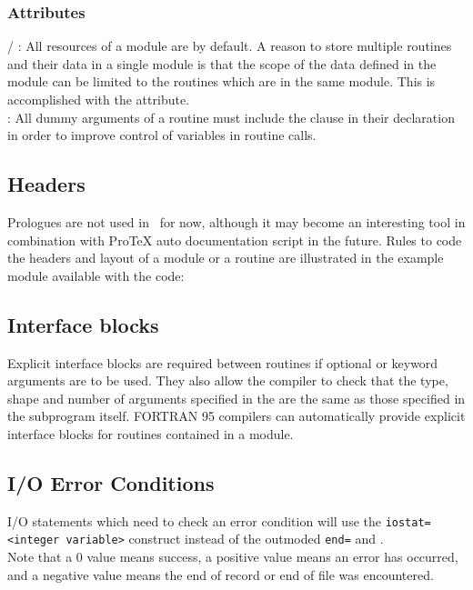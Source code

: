 \subsubsection{Attributes}

 / :
All resources of a module are  by default.
A reason to store multiple routines and their data in a single module is that
the scope of the data defined in the module can be limited to the routines which are in the same module.
This is accomplished with the  attribute. \\
:
All dummy arguments of a routine must include the  clause in their declaration in order to
improve control of variables in routine calls.

\subsection{Headers}

Prologues are not used in \NEMO\ for now, although it may become an interesting tool in combination with
ProTeX auto documentation script in the future.
Rules to code the headers and layout of a module or a routine are illustrated in the example module available with
the code: 

\subsection{Interface blocks}

Explicit interface blocks are required between routines if optional or keyword arguments are to be used.
They also allow the compiler to check that the type, shape and number of arguments specified in the 
are the same as those specified in the subprogram itself.
FORTRAN 95 compilers can automatically provide explicit interface blocks for routines contained in a module.

\subsection{I/O Error Conditions}

I/O statements which need to check an error condition will use the \texttt{iostat=<integer
variable>} construct instead of the outmoded \texttt{end=} and . \\ Note
that a 0 value means success, a positive value means an error has occurred, and a negative
value means the end of record or end of file was encountered.

